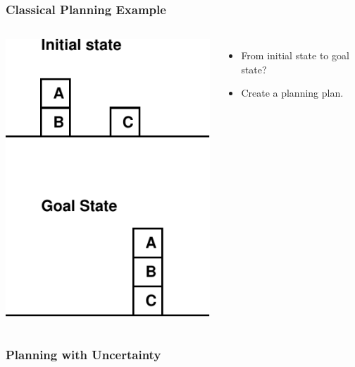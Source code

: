 \documentclass{beamer}
\let\origframetitle=\frametitle
\renewcommand\frametitle[1]{\origframetitle{\textbf{\large{\textrm{#1}}}}}
\begin{document}
\begin{frame}
  \frametitle{Classical Planning Example}

  \begin{columns}
    \includegraphics[width=\textwidth]{../presentation-plan/blocksworld.pdf}


    \begin{itemize}
      \item From initial state to goal state?
      \item Create a planning plan.
    \end{itemize}



  \end{columns}

\end{frame}

\begin{frame}
  \frametitle{Planning with Uncertainty}
\end{frame}
\end{document}
